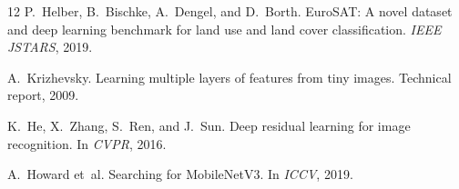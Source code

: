 \documentclass[11pt]{article}
\begin{document}
\begin{thebibliography}{12}
P.~Helber, B.~Bischke, A.~Dengel, and D.~Borth.
\newblock EuroSAT: A novel dataset and deep learning benchmark for land use
  and land cover classification.
\newblock \emph{IEEE JSTARS}, 2019.

A.~Krizhevsky.
\newblock Learning multiple layers of features from tiny images.
\newblock Technical report, 2009.

K.~He, X.~Zhang, S.~Ren, and J.~Sun.
\newblock Deep residual learning for image recognition.
\newblock In \emph{CVPR}, 2016.

A.~Howard et~al.
\newblock Searching for MobileNetV3.
\newblock In \emph{ICCV}, 2019.

\end{thebibliography}
\end{document}
